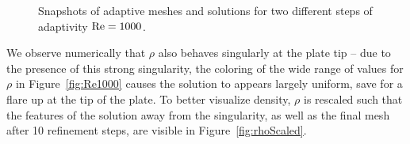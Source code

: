 \begin{figure}
\centering
{}
\caption{Snapshots of adaptive meshes and solutions for two different steps of adaptivity $\Reyn = 1000$.}
\label{fig:Re1000_midRefs}
\end{figure}

We observe numerically that $\rho$ also behaves singularly at the plate tip -- due to the presence of this strong singularity, the coloring of the wide range of values for $\rho$ in Figure~\ref{fig:Re1000} causes the solution to appears largely uniform, save for a flare up at the tip of the plate.  To better visualize density, $\rho$ is rescaled such that the features of the solution away from the singularity, as well as the final mesh after 10 refinement steps, are visible in Figure~\ref{fig:rhoScaled}.    

